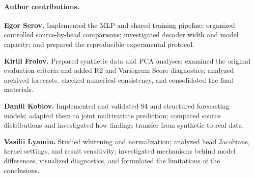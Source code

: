 \paragraph{Author contributions.}

\textbf{Egor Serov.} Implemented the MLP and shared training pipeline; organized controlled source-by-head comparisons; investigated decoder width and model capacity; and prepared the reproducible experimental protocol.

\textbf{Kirill Frolov.} Prepared synthetic data and PCA analyses; examined the original evaluation criteria and added R2 and Variogram Score diagnostics; analyzed archived forecasts, checked numerical consistency, and consolidated the final materials.

\textbf{Daniil Koblov.} Implemented and validated S4 and structured forecasting models; adapted them to joint multivariate prediction; compared source distributions and investigated how findings transfer from synthetic to real data.

\textbf{Vasilii Lyamin.} Studied whitening and normalization; analyzed head Jacobians, kernel settings, and result sensitivity; investigated mechanisms behind model differences, visualized diagnostics, and formulated the limitations of the conclusions.
